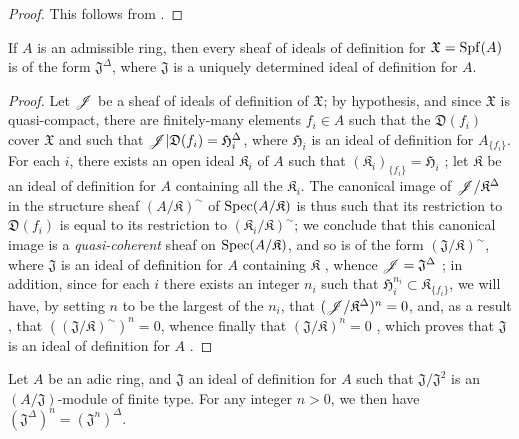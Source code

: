 \begin{proof}
\label{proof-1.10.3.4}
This follows from .
\end{proof}

\begin{proposition}[10.3.5]
\label{1.10.3.5}
If $A$ is an admissible ring, then every sheaf of ideals of definition for $\mathfrak{X}=\operatorname{Spf}(A)$ is of the form $\mathfrak{J}^\Delta$, where $\mathfrak{J}$ is a uniquely determined ideal of definition for $A$.
\end{proposition}

\begin{proof}
\label{proof-1.10.3.5}
Let $\mathscr{J}$ be a sheaf of ideals of definition of $\mathfrak{X}$; by hypothesis, and since $\mathfrak{X}$ is quasi-compact, there are finitely-many elements $f_i\in A$ such that the $\mathfrak{D}(f_i)$ cover $\mathfrak{X}$ and such that $\mathscr{J}|\mathfrak{D}(f_i)=\mathfrak{H}_i^\Delta$, where $\mathfrak{H}_i$ is an ideal of definition for $A_{\{f_i\}}$.
For each $i$, there exists an open ideal $\mathfrak{K}_i$ of $A$ such that $(\mathfrak{K}_i)_{\{f_i\}}=\mathfrak{H}_i$ ; let $\mathfrak{K}$ be an ideal of definition for $A$ containing all the $\mathfrak{K}_i$.
The canonical image of $\mathscr{J}/\mathfrak{K}^\Delta$ in the structure sheaf $(A/\mathfrak{K})^\sim$ of $\operatorname{Spec}(A/\mathfrak{K})$  is thus such that its restriction to $\mathfrak{D}(f_i)$ is equal to its restriction to $(\mathfrak{K}_i/\mathfrak{K})^\sim$;
we conclude that this canonical image is a \emph{quasi-coherent} sheaf on $\operatorname{Spec}(A/\mathfrak{K})$, and so is of the form $(\mathfrak{J}/\mathfrak{K})^\sim$, where $\mathfrak{J}$ is an ideal of definition for $A$ containing $\mathfrak{K}$ , whence $\mathscr{J}=\mathfrak{J}^\Delta$ ;
in addition, since for each $i$ there exists an integer $n_i$ such that $\mathfrak{H}_i^{n_i}\subset\mathfrak{K}_{\{f_i\}}$, we will have, by setting $n$ to be the largest of the $n_i$, that $(\mathscr{J}/\mathfrak{K}^\Delta)^n=0$, and, as a result , that $((\mathfrak{J}/\mathfrak{K})^\sim)^n=0$, whence finally that $(\mathfrak{J}/\mathfrak{K})^n=0$ , which proves that $\mathfrak{J}$ is an ideal of definition for $A$ .
\end{proof}

\begin{proposition}[10.3.6]
\label{1.10.3.6}
Let $A$ be an adic ring, and $\mathfrak{J}$ an ideal of definition for $A$ such that $\mathfrak{J}/\mathfrak{J}^2$ is an $(A/\mathfrak{J})$-module of finite type. For any integer $n>0$, we then have $(\mathfrak{J}^\Delta)^n=(\mathfrak{J}^n)^\Delta$.
\end{proposition}

